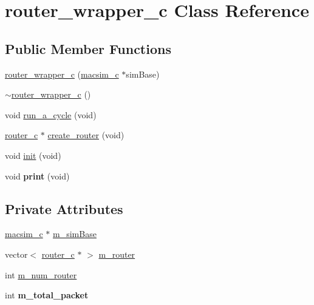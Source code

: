 \hypertarget{classrouter__wrapper__c}{
\section{router\_\-wrapper\_\-c Class Reference}
\label{classrouter__wrapper__c}
}
\subsection*{Public Member Functions}
\begin{DoxyCompactItemize}
\item 
\hyperlink{classrouter__wrapper__c_a8a5a2f3c025ec15bb83304f40f4ec5af}{router\_\-wrapper\_\-c} (\hyperlink{classmacsim__c}{macsim\_\-c} $\ast$simBase)
\item 
\hyperlink{classrouter__wrapper__c_af7a5e6c3c8722898588e9216614997e1}{$\sim$router\_\-wrapper\_\-c} ()
\item 
void \hyperlink{classrouter__wrapper__c_a0e120854ee0f5bd75469376a5dc6a4e5}{run\_\-a\_\-cycle} (void)
\item 
\hyperlink{classrouter__c}{router\_\-c} $\ast$ \hyperlink{classrouter__wrapper__c_a350c35e3343b07caee817d3896477ed3}{create\_\-router} (void)
\item 
void \hyperlink{classrouter__wrapper__c_ade1dbe89ffc5ebcff7a287569ff9e49f}{init} (void)
\item 
\hypertarget{classrouter__wrapper__c_ab5c12293343cc1bd77a18c50252673c0}{
void {\bfseries print} (void)}
\label{classrouter__wrapper__c_ab5c12293343cc1bd77a18c50252673c0}

\end{DoxyCompactItemize}
\subsection*{Private Attributes}
\begin{DoxyCompactItemize}
\item 
\hyperlink{classmacsim__c}{macsim\_\-c} $\ast$ \hyperlink{classrouter__wrapper__c_a7f34c887818e7073d5ae17acc0ce4461}{m\_\-simBase}
\item 
vector$<$ \hyperlink{classrouter__c}{router\_\-c} $\ast$ $>$ \hyperlink{classrouter__wrapper__c_a98f6fc4d587dd868a4b3849930d32271}{m\_\-router}
\item 
int \hyperlink{classrouter__wrapper__c_a1fe3154cc128d3550603cce234362dea}{m\_\-num\_\-router}
\item 
\hypertarget{classrouter__wrapper__c_afae7531da7295f88ef117c10f9ae5362}{
int {\bfseries m\_\-total\_\-packet}}
\label{classrouter__wrapper__c_afae7531da7295f88ef117c10f9ae5362}

\end{DoxyCompactItemize}


